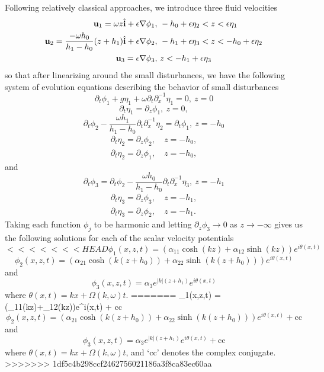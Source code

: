 \documentclass[a4paper,11pt]{article}
\newcommand{\pd}{\partial}
\begin{document}
Following relatively classical approaches, we introduce three fluid velocities
\begin{align*}
{\bf u}_{1} = \omega z \hat{{\bf i}} + \epsilon \nabla \phi_{1}, &  ~-h_{0}+\epsilon \eta_{2} < z < \epsilon \eta_{1}\\
{\bf u}_{2} = \frac{-\omega h_{0}}{h_{1}-h_{0}} (z+h_{1}) \hat{{\bf i}} + \epsilon \nabla \phi_{2}, & ~-h_{1}+\epsilon \eta_{3} < z < -h_{0}+\epsilon \eta_{2}\\
{\bf u}_{3} = \epsilon \nabla \phi_{3}, & ~z < -h_{1} + \epsilon \eta_{3}
\end{align*}    
so that after linearizing around the small disturbances, we have the following system of evolution equations describing the behavior of small disturbances
\[
\pd_{t}\phi_{1} + g\eta_{1} + \omega \pd_{t}\pd_{x}^{-1}\eta_{1} = 0, ~ z = 0 
\]
\[
\pd_{t}\eta_{1} = \pd_{z}\phi_{1}, ~ z = 0, 
\]
\[
\pd_{t}\phi_{2} - \frac{\omega h_{1}}{h_{1}-h_{0}} \pd_{t}\pd_{x}^{-1}\eta_{2} = \pd_{t}\phi_{1} , ~ z = -h_{0} 
\]
\begin{align*}
\pd_{t}\eta_{2} = \pd_{z}\phi_{2}, & ~ z = -h_{0},\\
\pd_{t}\eta_{2} = \pd_{z}\phi_{1}, & ~ z = -h_{0}, 
\end{align*}
and
\[
\pd_{t}\phi_{3} = \pd_{t}\phi_{2} - \frac{\omega h_{0}}{h_{1}-h_{0}} \pd_{t}\pd_{x}^{-1}\eta_{3}, ~ z = -h_{1} 
\]
\begin{align*}
\pd_{t}\eta_{3} = \pd_{z}\phi_{3}, & ~ z = -h_{1},\\
\pd_{t}\eta_{3} = \pd_{z}\phi_{2}, & ~ z = -h_{1}. 
\end{align*}
Taking each function $\phi_{j}$ to be harmonic and letting $\pd_{z}\phi_{3}\rightarrow 0 $ as $z\rightarrow -\infty$ gives us the following solutions for each of the scalar velocity potentials
\[
<<<<<<< HEAD
\phi_{1}(x,z,t) = \left(\alpha_{11}\cosh(kz)+\alpha_{12}\sinh(kz)\right)e^{i\theta(x,t)}
\]
\[
\phi_{2}(x,z,t) = \left(\alpha_{21}\cosh(k(z+h_{0}))+\alpha_{22}\sinh(k(z+h_{0}))\right)e^{i\theta(x,t)}
\]
and
\[
\phi_{3}(x,z,t) = \alpha_{3}e^{|k|(z+h_{1})}e^{i\theta(x,t)}
\]
where $\theta(x,t) = kx + \Omega(k,\omega)t$.
=======
\phi_{1}(x,z,t) = \left(\alpha_{11}\cosh(kz)+\alpha_{12}\sinh(kz)\right)e^{i\theta(x,t)} + \mbox{cc}
\]
\[
\phi_{2}(x,z,t) = \left(\alpha_{21}\cosh(k(z+h_{0}))+\alpha_{22}\sinh(k(z+h_{0}))\right)e^{i\theta(x,t)} + \mbox{cc}
\]
and
\[
\phi_{3}(x,z,t) = \alpha_{3}e^{|k|(z+h_{1})}e^{i\theta(x,t)} + \mbox{cc}
\]
where $\theta(x,t) = kx + \Omega(k,\omega)t$, and `cc' denotes the complex conjugate.  
>>>>>>> 1df5c4b298ccf2462756021186a3f8ca83ec60aa
\end{document}
